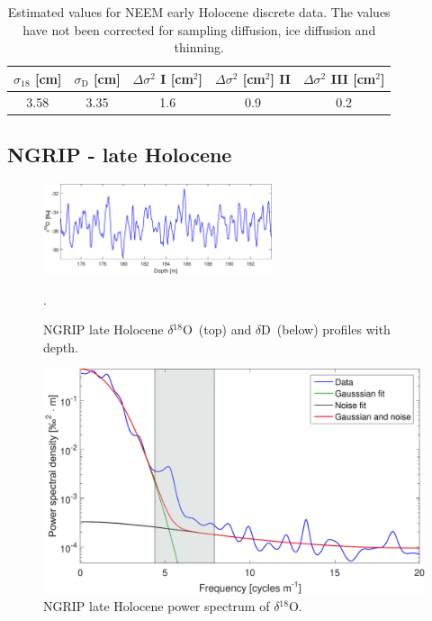 \documentclass[11pt, draftcls, onecolumn]{IEEEtran} %
\numberwithin{equation}{section}
\numberwithin{table}{section}
\numberwithin{figure}{section}
\newcommand{\delOx}{$\delta{}^{18}\mathrm{O}$}
\newcommand{\delD}{$\delta\mathrm{D}$}
\begin{document}
\begin{appendices}
\begin{table}[H]
	\center
	\caption{Estimated values for NEEM early Holocene discrete data.
		The values have not been corrected for sampling diffusion, ice diffusion and thinning.}
	\label{NEEM_dis_tbl}
	\begin{tabular}{c c c c c} 
		\toprule
		$\sigma_{18}$ [cm] & $\sigma_\mathrm{D}$ [cm] & $\Delta\sigma^2$ I [cm$^2$] & $\Delta\sigma^2$ [cm$^2$] II & $\Delta\sigma^2$ III [cm$^2$] \\
		\midrule
		3.58 &   3.35 &     1.6 &     0.9 &     0.2 \\
		
		\bottomrule		
	\end{tabular}
\end{table}
\clearpage
\subsection{NGRIP - late Holocene}

\begin{figure}[H]
	\vspace*{2mm}
	\begin{center}
		\includegraphics[width=0.6\textwidth]{NGRIP_late_holo}
		\caption{NGRIP late Holocene \delOx~(top) and \delD~(below) profiles with depth.}  \label{fig:NGRIP_late_holo}.
	\end{center}
\end{figure}


\begin{figure}[H]
	\vspace*{2mm}
	\begin{center}
		\includegraphics[width=.5\textwidth]{Figure_18}
		\caption{NGRIP late Holocene power spectrum of \delOx.}  \label{fig:NGRIP_late}
	\end{center}
\end{figure}


\end{appendices}
\end{document}
